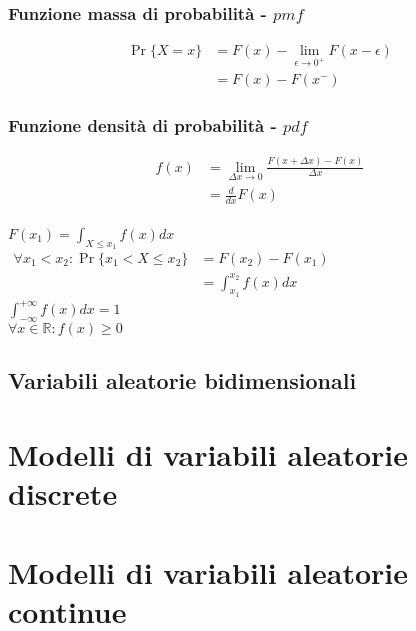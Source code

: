 \documentclass[a4paper,12pt]{article}
\theoremstyle{mystyle}
\begin{document}
\subsubsection{\texorpdfstring{Funzione massa di probabilità - \(pmf\)}{Funzione massa di probabilità - pmf}}

\[
    \begin{aligned}
        \Pr\{X=x\}
        & = F(x) - \lim_{\epsilon \rightarrow 0^+} F(x-\epsilon) \\
        & = F(x) - F(x^-)
    \end{aligned}
\]

\subsubsection{\texorpdfstring{Funzione densità di probabilità - \(pdf\)}{Funzione densità di probabilità - pdf}}

\[
    \begin{aligned}
        f(x)
        &=\lim_{\Delta x \rightarrow 0} \frac{F(x+\Delta x) - F(x)}{\Delta x} \\
        & = \frac{d}{dx} F(x)
    \end{aligned}
\] \\

\(F(x_1) = \int_{X \leq x_1} f(x) dx\) \\
\(
    \begin{aligned}
        \forall x_1 < x_2 : \Pr\{x_1 <X \leq x_2\}
        & =  F(x_2) - F(x_1) \\
        & = \int_{x_1}^{x_2} f(x) dx
    \end{aligned}
\) \\
\(\int_{-\infty}^{+\infty} f(x) dx = 1 \) \\
\(\forall x \in \mathbb R : f(x) \geq 0\)

\subsection{Variabili aleatorie bidimensionali}

\section{Modelli di variabili aleatorie discrete}

\section{Modelli di variabili aleatorie continue}
\end{document}
